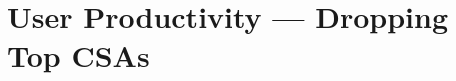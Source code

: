 \documentclass[11pt]{article}
\begin{document}
\section*{User Productivity — Dropping Top CSAs}

\end{document}
